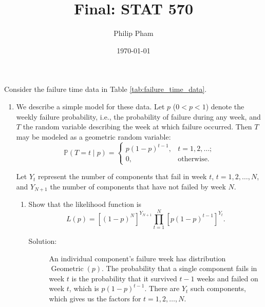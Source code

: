 \documentclass[letterpaper,11pt]{article}
\title{Final: STAT 570}
\author{Philip Pham}
\date{\today}
\begin{document}
\maketitle

Consider the failure time data in Table \ref{tab:failure_time_data}.

\begin{enumerate}
\item We describe a simple model for these data. Let $p$ ($0 < p < 1$) denote
  the weekly failure probability, i.e., the probability of failure during any
  week, and $T$ the random variable describing the week at which failure
  occurred. Then $T$ may be modeled as a geometric random variable:
  \begin{equation}
    \mathbb{P}\left(T = t \mid p\right)
    = \begin{cases}
      p\left(1-p\right)^{t-1}, &t=1,2,\ldots; \\
      0,&\text{otherwise}.      
    \end{cases}
    \label{eqn:p1_model}
  \end{equation}

  Let $Y_t$ represent the number of components that fail in week $t$,
  $t = 1,2,\ldots,N$, and $Y_{N+1}$ the number of components that have not failed
  by week $N$.

  \begin{enumerate}
  \item Show that the likelihood function is
    \begin{equation}
      L\left(p\right) =
      \left[\left(1 - p\right)^N\right]^{Y_{N+1}}
      \prod_{t=1}^N\left[
        p\left(1 - p\right)^{t-1}
      \right]^{Y_t}.
      \label{eqn:p1_likelihood}      
    \end{equation}
    \begin{description}
    \item[Solution:] An individual component's failure week has distribution
      $\operatorname{Geometric}\left(p\right)$. The probability that a single
      component fails in week $t$ is the probability that it survived $t - 1$
      weeks and failed on week $t$, which is $p\left(1 - p\right)^{t-1}$. There
      are $Y_t$ such components, which gives us the factors for
      $t = 1,2,\ldots,N$.


\end{description}
\end{enumerate}
\end{enumerate}
\end{document}
